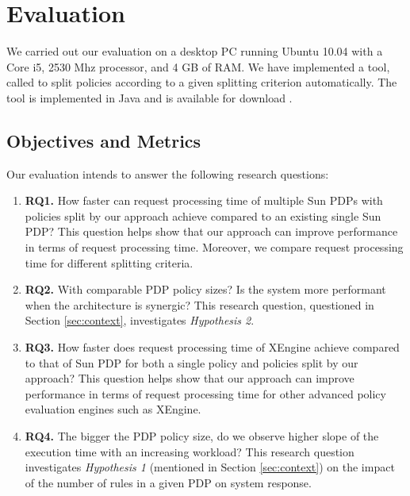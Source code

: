 \section{Evaluation} \label{sec:experiment}
We carried out our evaluation on a desktop PC running Ubuntu 10.04 with a Core i5, 2530 Mhz processor, and 4 GB of RAM. 
We have implemented a tool, called  to split policies according to a given splitting criterion automatically.
The tool is implemented in Java and is available for download \cite{splitter}.

\subsection{Objectives and Metrics}
Our evaluation intends to answer the following research questions:
\begin{enumerate}
\item \textbf{RQ1.} How faster can request processing time of multiple Sun PDPs with policies split by our approach achieve compared
to an existing single Sun PDP? This question helps show that our approach can improve performance in terms of request processing time. 
Moreover, we compare request processing time for different splitting criteria.
\item \textbf{RQ2.} With comparable PDP policy sizes? Is the system more performant when the architecture is synergic? 
This research question, questioned in Section \ref{sec:context}, investigates \textit{Hypothesis 2}.
\item \textbf{RQ3.} How faster does request processing time of XEngine achieve compared
to that of Sun PDP for both a single policy and policies split by our approach?
This question helps show that our approach can improve performance in terms of request processing time for other advanced policy evaluation 
engines such as XEngine.
\item \textbf{RQ4.} The bigger the PDP policy size, do we observe higher slope of the execution time with an increasing workload? This research question investigates \textit{Hypothesis 1} 
(mentioned in Section \ref{sec:context}) on the impact of the number of rules in a given PDP on system response.
\end{enumerate}

